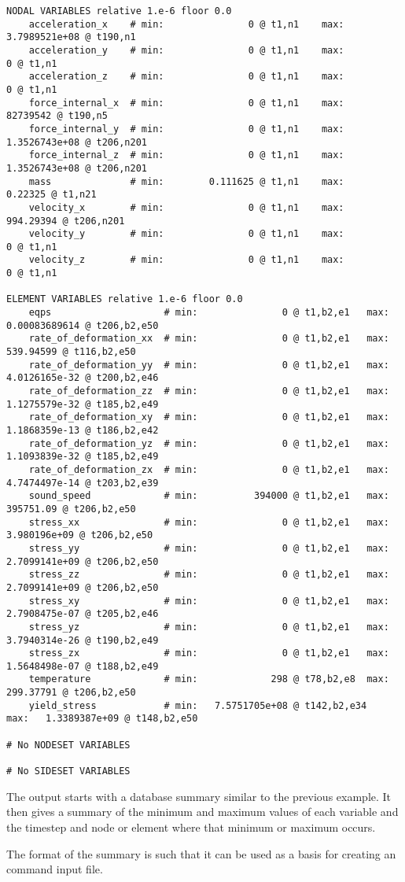 \begin{verbatim}
NODAL VARIABLES relative 1.e-6 floor 0.0
	acceleration_x    # min:               0 @ t1,n1	max:   3.7989521e+08 @ t190,n1
	acceleration_y    # min:               0 @ t1,n1	max:               0 @ t1,n1
	acceleration_z    # min:               0 @ t1,n1	max:               0 @ t1,n1
	force_internal_x  # min:               0 @ t1,n1	max:        82739542 @ t190,n5
	force_internal_y  # min:               0 @ t1,n1	max:   1.3526743e+08 @ t206,n201
	force_internal_z  # min:               0 @ t1,n1	max:   1.3526743e+08 @ t206,n201
	mass              # min:        0.111625 @ t1,n1	max:         0.22325 @ t1,n21
	velocity_x        # min:               0 @ t1,n1	max:       994.29394 @ t206,n201
	velocity_y        # min:               0 @ t1,n1	max:               0 @ t1,n1
	velocity_z        # min:               0 @ t1,n1	max:               0 @ t1,n1

ELEMENT VARIABLES relative 1.e-6 floor 0.0
	eqps                    # min:               0 @ t1,b2,e1	max:   0.00083689614 @ t206,b2,e50
	rate_of_deformation_xx  # min:               0 @ t1,b2,e1	max:       539.94599 @ t116,b2,e50
	rate_of_deformation_yy  # min:               0 @ t1,b2,e1	max:   4.0126165e-32 @ t200,b2,e46
	rate_of_deformation_zz  # min:               0 @ t1,b2,e1	max:   1.1275579e-32 @ t185,b2,e49
	rate_of_deformation_xy  # min:               0 @ t1,b2,e1	max:   1.1868359e-13 @ t186,b2,e42
	rate_of_deformation_yz  # min:               0 @ t1,b2,e1	max:   1.1093839e-32 @ t185,b2,e49
	rate_of_deformation_zx  # min:               0 @ t1,b2,e1	max:   4.7474497e-14 @ t203,b2,e39
	sound_speed             # min:          394000 @ t1,b2,e1	max:       395751.09 @ t206,b2,e50
	stress_xx               # min:               0 @ t1,b2,e1	max:    3.980196e+09 @ t206,b2,e50
	stress_yy               # min:               0 @ t1,b2,e1	max:   2.7099141e+09 @ t206,b2,e50
	stress_zz               # min:               0 @ t1,b2,e1	max:   2.7099141e+09 @ t206,b2,e50
	stress_xy               # min:               0 @ t1,b2,e1	max:   2.7908475e-07 @ t205,b2,e46
	stress_yz               # min:               0 @ t1,b2,e1	max:   3.7940314e-26 @ t190,b2,e49
	stress_zx               # min:               0 @ t1,b2,e1	max:   1.5648498e-07 @ t188,b2,e49
	temperature             # min:             298 @ t78,b2,e8	max:       299.37791 @ t206,b2,e50
	yield_stress            # min:   7.5751705e+08 @ t142,b2,e34	max:   1.3389387e+09 @ t148,b2,e50

# No NODESET VARIABLES

# No SIDESET VARIABLES
\end{verbatim}
\sectionline
The output starts with a database summary similar to the previous
example.  It then gives a summary of the minimum and maximum values of
each variable and the timestep and node or element where that minimum
or maximum occurs.  

The format of the summary is such that it can be used as a basis for
creating an \exodiff{} command input file.
